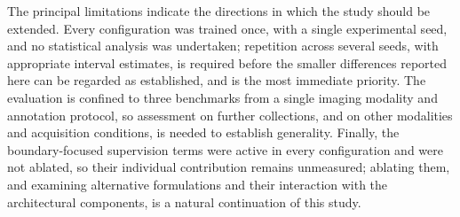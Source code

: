 The principal limitations indicate the directions in which the study should be extended. Every configuration was trained once, with a single experimental seed, and no statistical analysis was undertaken; repetition across several seeds, with appropriate interval estimates, is required before the smaller differences reported here can be regarded as established, and is the most immediate priority. The evaluation is confined to three benchmarks from a single imaging modality and annotation protocol, so assessment on further collections, and on other modalities and acquisition conditions, is needed to establish generality. Finally, the boundary-focused supervision terms were active in every configuration and were not ablated, so their individual contribution remains unmeasured; ablating them, and examining alternative formulations and their interaction with the architectural components, is a natural continuation of this study.
